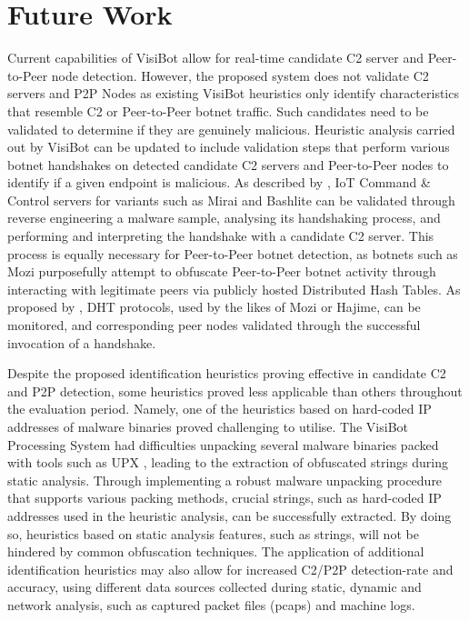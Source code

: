 \section{Future Work}

Current capabilities of VisiBot allow for real-time candidate C2 server and Peer-to-Peer node detection. However, the proposed system does not validate C2 servers and P2P Nodes as existing VisiBot heuristics only identify characteristics that resemble C2 or Peer-to-Peer botnet traffic. Such candidates need to be validated to determine if they are genuinely malicious. Heuristic analysis carried out by VisiBot can be updated to include validation steps that perform various botnet handshakes on detected candidate C2 servers and Peer-to-Peer nodes to identify if a given endpoint is malicious. As described by \citet{Bastos2019}, IoT Command \& Control servers for variants such as Mirai and Bashlite can be validated through reverse engineering a malware sample, analysing its handshaking process, and performing and interpreting the handshake with a candidate C2 server. This process is equally necessary for Peer-to-Peer botnet detection, as botnets such as Mozi purposefully attempt to obfuscate Peer-to-Peer botnet activity through interacting with legitimate peers via publicly hosted Distributed Hash Tables. \citep{Netlab2019} As proposed by \citet{Herwig2019}, DHT protocols, used by the likes of Mozi or Hajime, can be monitored, and corresponding peer nodes validated through the successful invocation of a handshake.

Despite the proposed identification heuristics proving effective in candidate C2 and P2P detection, some heuristics proved less applicable than others throughout the evaluation period. Namely, one of the heuristics based on hard-coded IP addresses of malware binaries proved challenging to utilise. The VisiBot Processing System had difficulties unpacking several malware binaries packed with tools such as UPX \citep{UPX}, leading to the extraction of obfuscated strings during static analysis. Through implementing a robust malware unpacking procedure that supports various packing methods, crucial strings, such as hard-coded IP addresses used in the heuristic analysis, can be successfully extracted. By doing so, heuristics based on static analysis features, such as strings, will not be hindered by common obfuscation techniques. The application of additional identification heuristics may also allow for increased C2/P2P detection-rate and accuracy, using different data sources collected during static, dynamic and network analysis, such as captured packet files (pcaps) and machine logs.

